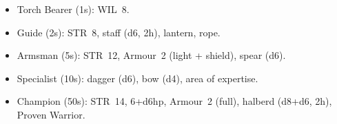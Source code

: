 \documentclass[itdr]{subfiles}
\begin{document}
\begin{itemize}
	\item Torch Bearer (1s): WIL~8.
	\item Guide (2s): STR~8, staff (d6, 2h), lantern, rope.
	\item Armsman (5s): STR~12, Armour~2 (light + shield), spear (d6).
	\item Specialist (10s): dagger (d6), bow (d4), area of expertise.
	\item Champion (50s): STR~14, 6+d6hp, Armour~2 (full), halberd (d8+d6, 2h), Proven Warrior.
\end{itemize}


\end{document}
